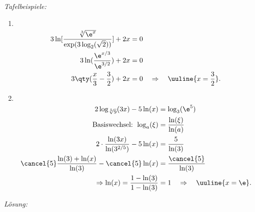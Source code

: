 \emph{Tafelbeispiele:}
\begin{enumerate}
    \item$~$\\[-1.7cm]
    \begin{align}
        3 \ln[\frac{\sqrt[3]{\e^x}}{\exp(3\log_2(\sqrt{2}))}] + 2x &= 0 \\
        3 \ln(\frac{\e^{x/3}}{\e^{3/2}}) +2x &= 0\\
        3\qty(\frac{x}{3}-\frac{3}{2}) + 2x &= 0 \quad \Rightarrow \quad \uuline{x = \frac{3}{2}}.
    \end{align}
    \item$~$\\[-1.4cm]
    \begin{align}
        2 \log_{\sqrt[5]{9}}(3x) - 5\ln(x) &= \log_3(\e^{5}) \\
        \text{Basiswechsel: } \log_a(\xi) &= \frac{\ln(\xi)}{\ln(a)} \\
        2\cdot \frac{\ln(3x)}{\ln(3^{2/5})} - 5\ln(x) &= \frac{5}{\ln(3)} \\
        \cancel{5} \frac{\ln(3)+\ln(x)}{\ln(3)} - \cancel{5} \ln(x) &= \frac{\cancel{5}}{\ln(3)} \\
        \Rightarrow \ln(x) = \frac{1-\ln(3)}{1-\ln(3)} &= 1 \quad \Rightarrow \quad \uuline{x=\e}.
    \end{align}
\end{enumerate}
\emph{Lösung:}
